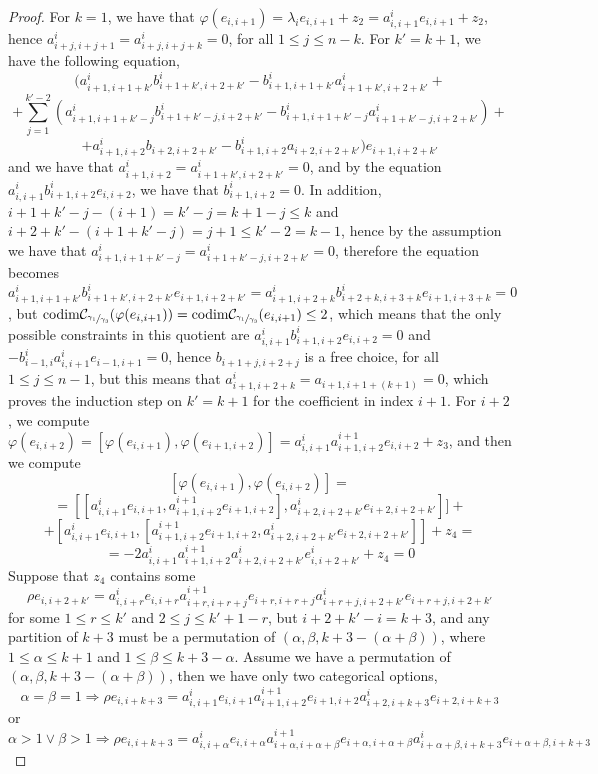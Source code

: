 \documentclass[12pt,fleqn]{article}
\begin{document}
\begin{proof}
For $k=1$, we have that $\varphi(e_{i,i+1})=\lambda_{i}e_{i,i+1}+z_2=a_{i,i+1}^{i}e_{i,i+1}+z_2$, hence $a_{i+j,i+j+1}^{i}=a_{i+j,i+j+k}^{i}=0$, for all $1\leq j\leq n-k$. For $k'=k+1$, we have the following equation, \[(a_{i+1,i+1+k'}^{i}b_{i+1+k',i+2+k'}^{i}-b_{i+1,i+1+k'}^{i}a_{i+1+k',i+2+k'}^{i}+\]\[+\sum_{j=1}^{k'-2}(a_{i+1,i+1+k'-j}^{i}b_{i+1+k'-j,i+2+k'}^{i}-b_{i+1,i+1+k'-j}^{i}a_{i+1+k'-j,i+2+k'}^{i})+\]\[+a_{i+1,i+2}^{i}b_{i+2,i+2+k'}-b_{i+1,i+2}^{i}a_{i+2,i+2+k'})e_{i+1,i+2+k'}\]
and we have that $a_{i+1,i+2}^{i}=a_{i+1+k',i+2+k'}^{i}=0$, and by the equation $a_{i,i+1}^{i}b_{i+1,i+2}^{i}e_{i,i+2}$, we have that $b_{i+1,i+2}^{i}=0$. In addition, $i+1+k'-j-(i+1)=k'-j=k+1-j\leq k$ and $i+2+k'-(i+1+k'-j)=j+1\leq k'-2=k-1$, hence by the assumption we have that $a_{i+1,i+1+k'-j}^{i}=a_{i+1+k'-j,i+2+k'}^{i}=0$, therefore the equation becomes $a_{i+1,i+1+k'}^{i}b_{i+1+k',i+2+k'}^{i}e_{i+1,i+2+k'}=a_{i+1,i+2+k}^{i}b_{i+2+k,i+3+k}^{i}e_{i+1,i+3+k}=0$, but $\mathrm{codim}\mathcal{C}_{\sfrac{\gamma_1}{\gamma_3}}(\varphi(e_{i,i+1}))=\mathrm{codim}\mathcal{C}_{\sfrac{\gamma_1}{\gamma_3}}(e_{i,i+1})\leq 2$, which means that the only possible constraints in this quotient are $a_{i,i+1}^{i}b_{i+1,i+2}^{i}e_{i,i+2}=0$ and $-b_{i-1,i}^{i}a_{i,i+1}^{i}e_{i-1,i+1}=0$, hence $b_{i+1+j,i+2+j}$ is a free choice, for all $1\leq j\leq n-1$, but this means that $a_{i+1,i+2+k}^{i}=a_{i+1,i+1+(k+1)}=0$, which proves the induction step on $k'=k+1$ for the coefficient in index $i+1$.
For $i+2$, we compute $\varphi(e_{i,i+2})=[\varphi(e_{i,i+1}),\varphi(e_{i+1,i+2})]=a_{i,i+1}^{i}a_{i+1,i+2}^{i+1}e_{i,i+2}+z_3$, and then we compute \[[\varphi(e_{i,i+1}),\varphi(e_{i,i+2})]=\]\[=[[a_{i,i+1}^{i}e_{i,i+1},a_{i+1,i+2}^{i+1}e_{i+1,i+2}],a_{i+2,i+2+k'}^{i}e_{i+2,i+2+k'}]]+\]\[+[a_{i,i+1}^{i}e_{i,i+1},[a_{i+1,i+2}^{i+1}e_{i+1,i+2},a_{i+2,i+2+k'}^{i}e_{i+2,i+2+k'}]]+z_4=\]\[=-2a_{i,i+1}^{i}a_{i+1,i+2}^{i+1}a_{i+2,i+2+k'}^{i}e_{i,i+2+k'}^{i}+z_4=0\]
Suppose that $z_4$ contains some \[{\rho}e_{i,i+2+k'}=a_{i,i+r}^{i}e_{i,i+r}a_{i+r,i+r+j}^{i+1}e_{i+r,i+r+j}a_{i+r+j,i+2+k'}^{i}e_{i+r+j,i+2+k'}\]
for some $1\leq r\leq k'$ and $2\leq j\leq k'+1-r$, but $i+2+k'-i=k+3$, and any partition of $k+3$ must be a permutation of $(\alpha,\beta,k+3-(\alpha+\beta))$, where $1\leq\alpha\leq{k+1}$ and $1\leq\beta\leq{k+3-\alpha}$. Assume we have a permutation of $(\alpha,\beta,k+3-(\alpha+\beta))$, then we have only two categorical options, \[\alpha=\beta=1\Rightarrow{\rho}e_{i,i+k+3}=a_{i,i+1}^{i}e_{i,i+1}a_{i+1,i+2}^{i+1}e_{i+1,i+2}a_{i+2,i+k+3}^{i}e_{i+2,i+k+3}\]
or  \[\alpha>1\lor\beta>1\Rightarrow{\rho}e_{i,i+k+3}=a_{i,i+\alpha}^{i}e_{i,i+\alpha}a_{i+\alpha,i+\alpha+\beta}^{i+1}e_{i+\alpha,i+\alpha+\beta}a_{i+\alpha+\beta,i+k+3}^{i}e_{i+\alpha+\beta,i+k+3}\]

\end{proof}
\end{document}
